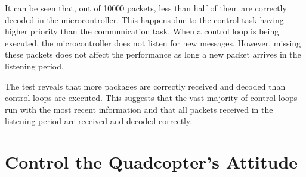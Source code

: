 It can be seen that, out of 10000 packets, less than half of them are correctly decoded in the microcontroller. This happens due to the control task having higher priority than the communication task. When a control loop is being executed, the microcontroller does not listen for new messages. However, missing these packets does not affect the performance as long a new packet arrives in the listening period.

The test reveals that more packages are correctly received and decoded than control loops are executed. This suggests that the vast majority of control loops run with the most recent information and that all packets received in the listening period are received and decoded correctly. 
 

\section{Control the Quadcopter's Attitude} \label{sec:accepttestAttitude}



